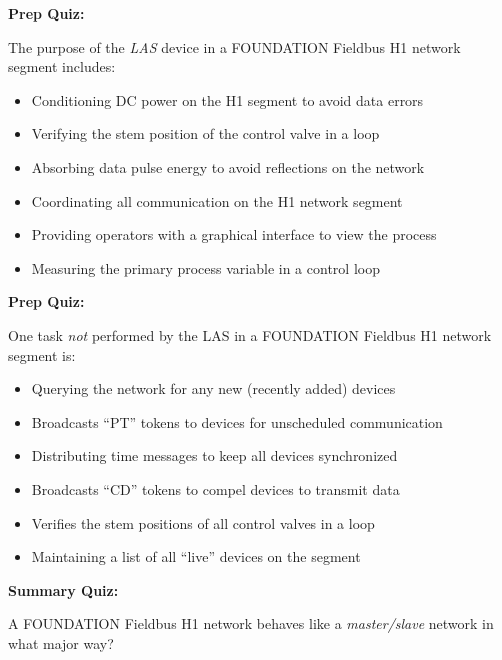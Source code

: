 \vfil \eject

\noindent
{\bf Prep Quiz:}

The purpose of the {\it LAS} device in a FOUNDATION Fieldbus H1 network segment includes:

\begin{itemize}
\item{} Conditioning DC power on the H1 segment to avoid data errors
\vskip 5pt 
\item{} Verifying the stem position of the control valve in a loop
\vskip 5pt 
\item{} Absorbing data pulse energy to avoid reflections on the network
\vskip 5pt 
\item{} Coordinating all communication on the H1 network segment
\vskip 5pt 
\item{} Providing operators with a graphical interface to view the process
\vskip 5pt 
\item{} Measuring the primary process variable in a control loop
\end{itemize}







\vfil \eject

\noindent
{\bf Prep Quiz:}

One task {\it not} performed by the LAS in a FOUNDATION Fieldbus H1 network segment is:

\begin{itemize}
\item{} Querying the network for any new (recently added) devices
\vskip 5pt 
\item{} Broadcasts ``PT'' tokens to devices for unscheduled communication
\vskip 5pt 
\item{} Distributing time messages to keep all devices synchronized
\vskip 5pt 
\item{} Broadcasts ``CD'' tokens to compel devices to transmit data
\vskip 5pt 
\item{} Verifies the stem positions of all control valves in a loop 
\vskip 5pt 
\item{} Maintaining a list of all ``live'' devices on the segment
\end{itemize}






\vfil \eject

\noindent
{\bf Summary Quiz:}

A FOUNDATION Fieldbus H1 network behaves like a {\it master/slave} network in what major way?

